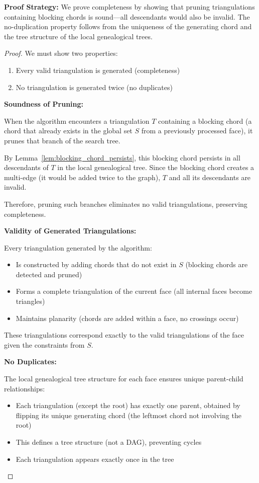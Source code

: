 \documentclass[12pt,a4paper]{article}
\theoremstyle{definition}
\theoremstyle{remark}
\begin{document}
\textbf{Proof Strategy:} We prove completeness by showing that pruning triangulations containing blocking chords is sound---all descendants would also be invalid. The no-duplication property follows from the uniqueness of the generating chord and the tree structure of the local genealogical trees.

\begin{proof}
We must show two properties:
\begin{enumerate}
    \item Every valid triangulation is generated (completeness)
    \item No triangulation is generated twice (no duplicates)
\end{enumerate}

\textbf{Soundness of Pruning:}

When the algorithm encounters a triangulation $T$ containing a blocking chord (a chord that already exists in the global set $S$ from a previously processed face), it prunes that branch of the search tree.

By Lemma~\ref{lem:blocking_chord_persists}, this blocking chord persists in all descendants of $T$ in the local genealogical tree. Since the blocking chord creates a multi-edge (it would be added twice to the graph), $T$ and all its descendants are invalid.

Therefore, pruning such branches eliminates no valid triangulations, preserving completeness.

\textbf{Validity of Generated Triangulations:}

Every triangulation generated by the algorithm:
\begin{itemize}
    \item Is constructed by adding chords that do not exist in $S$ (blocking chords are detected and pruned)
    \item Forms a complete triangulation of the current face (all internal faces become triangles)
    \item Maintains planarity (chords are added within a face, no crossings occur)
\end{itemize}

These triangulations correspond exactly to the valid triangulations of the face given the constraints from $S$.

\textbf{No Duplicates:}

The local genealogical tree structure for each face ensures unique parent-child relationships:
\begin{itemize}
    \item Each triangulation (except the root) has exactly one parent, obtained by flipping its unique generating chord (the leftmost chord not involving the root)
    \item This defines a tree structure (not a DAG), preventing cycles
    \item Each triangulation appears exactly once in the tree
\end{itemize}


\end{proof}
\end{document}
